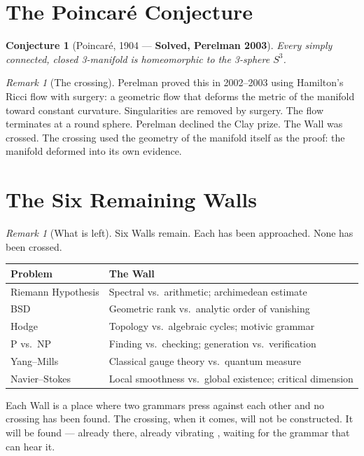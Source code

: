 \documentclass[12pt]{article}
\newtheorem{conjecture}[theorem]{Conjecture}
\theoremstyle{definition}
\theoremstyle{remark}
\newtheorem{remark}[theorem]{Remark}
\begin{document}
\section{The Poincar\'e Conjecture}

\begin{conjecture}[Poincar\'e, 1904 --- \textbf{Solved, Perelman 2003}]
Every simply connected, closed 3-manifold
is homeomorphic to the 3-sphere $S^3$.
\end{conjecture}

\begin{remark}[The crossing]
Perelman proved this in 2002--2003
using Hamilton's Ricci flow with surgery:
a geometric flow that deforms the metric of the manifold
toward constant curvature.
Singularities are removed by surgery.
The flow terminates at a round sphere.
Perelman declined the Clay prize.
The Wall was crossed.
The crossing used the geometry of the manifold itself
as the proof: the manifold deformed into its own evidence.
\end{remark}

\section{The Six Remaining Walls}

\begin{remark}[What is left]
Six Walls remain.
Each has been approached.
None has been crossed.
\begin{center}
\renewcommand{\arraystretch}{1.4}
\begin{tabular}{@{}ll@{}}
Problem & The Wall \\
\hline
Riemann Hypothesis & Spectral vs.\ arithmetic; archimedean estimate \\
BSD & Geometric rank vs.\ analytic order of vanishing \\
Hodge & Topology vs.\ algebraic cycles; motivic grammar \\
P vs.\ NP & Finding vs.\ checking; generation vs.\ verification \\
Yang--Mills & Classical gauge theory vs.\ quantum measure \\
Navier--Stokes & Local smoothness vs.\ global existence; critical dimension \\
\end{tabular}
\end{center}

Each Wall is a place where two grammars press against each other
and no crossing has been found.
The crossing, when it comes,
will not be constructed.
It will be found ---
already there, already vibrating \cite{the_string},
waiting for the grammar that can hear it.
\end{remark}
\end{document}
